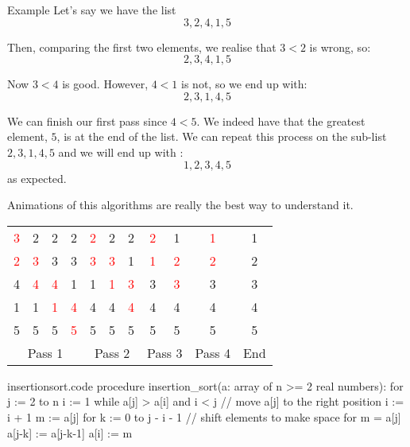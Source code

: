 \documentclass[a4paper]{article}
\begin{document}
\begin{parag}{Example}
    Let's say we have the list
    \[3, 2, 4, 1, 5\]

    Then, comparing the first two elements, we realise that $3 < 2$ is wrong, so:
    \[2, 3, 4, 1, 5\]

    Now $3 < 4$ is good. However, $4 < 1$ is not, so we end up with:
    \[2, 3, 1, 4, 5\]

    We can finish our first pass since $4 < 5$. We indeed have that the greatest element, $5$, is at the end of the list. We can repeat this process on the sub-list $2, 3, 1, 4, 5$ and we will end up with :
    \[1, 2, 3, 4, 5\]
    as expected.

    Animations of this algorithms are really the best way to understand it.

    \begin{center}
    \begin{tabular}{cccc|ccc|cc|c|c}
        \textcolor{red}{3} & 2 & 2 & 2 & \textcolor{red}{2} & 2 & 2 & \textcolor{red}{2} & 1 & \textcolor{red}{1} & \textcolor{maincolour}{1}\\
        \textcolor{red}{2} & \textcolor{red}{3} & 3 & 3 & \textcolor{red}{3} & \textcolor{red}{3} & 1 & \textcolor{red}{1} & \textcolor{red}{2} & \textcolor{red}{2} & \textcolor{maincolour}{2} \\
        4 & \textcolor{red}{4} & \textcolor{red}{4} & 1 & 1 & \textcolor{red}{1} & \textcolor{red}{3} & 3 & \textcolor{red}{3} & \textcolor{maincolour}{3} & \textcolor{maincolour}{3} \\
        1 & 1 & \textcolor{red}{1} & \textcolor{red}{4} & 4 & 4 & \textcolor{red}{4} & \textcolor{maincolour}{4} & \textcolor{maincolour}{4} & \textcolor{maincolour}{4} & \textcolor{maincolour}{4}  \\
        5 & 5 & 5 & \textcolor{red}{5} & \textcolor{maincolour}{5} & \textcolor{maincolour}{5} & \textcolor{maincolour}{5} & \textcolor{maincolour}{5} & \textcolor{maincolour}{5} & \textcolor{maincolour}{5} & \textcolor{maincolour}{5} \\
        \hline
        \multicolumn{4}{c}{Pass 1} & \multicolumn{3}{c}{Pass 2} & \multicolumn{2}{c}{Pass 3} & \multicolumn{1}{c}{Pass 4} & End
    \end{tabular}
    \end{center}

\end{parag}

\begin{filecontents*}[overwrite]{insertionsort.code}
procedure insertion_sort(a: array of n >= 2 real numbers):
    for j := 2 to n
        i := 1
        while a[j] > a[i] and i < j  // move a[j] to the right position
            i := i + 1
        m := a[j]
        for k := 0 to j - i - 1  // shift elements to make space for m = a[j]
            a[j-k] := a[j-k-1]
        a[i] := m
\end{filecontents*}
\end{document}
